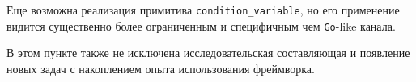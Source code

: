 \begin{itemize}
    Еще возможна реализация примитива \texttt{condition\_variable}, но его применение видится существенно более ограниченным и специфичным чем \texttt{Go}-like канала.

    В этом пункте также не исключена исследовательская составляющая и появление новых задач с накоплением опыта использования фреймворка.
\end{itemize}


